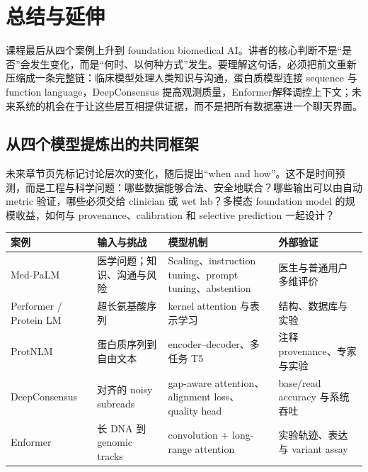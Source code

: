 \section{总结与延伸}

课程最后从四个案例上升到 foundation biomedical AI。讲者的核心判断不是“是否”会发生变化，而是“何时、以何种方式”发生。要理解这句话，必须把前文重新压缩成一条完整链：临床模型处理人类知识与沟通，蛋白质模型连接 sequence 与 function language，DeepConsensus 提高观测质量，Enformer解释调控上下文；未来系统的机会在于让这些层互相提供证据，而不是把所有数据塞进一个聊天界面。

\subsection{从四个模型提炼出的共同框架}

未来章节页先标记讨论层次的变化，随后提出“when and how”。这不是时间预测，而是工程与科学问题：哪些数据能够合法、安全地联合？哪些输出可以由自动 metric 验证，哪些必须交给 clinician 或 wet lab？多模态 foundation model 的规模收益，如何与 provenance、calibration 和 selective prediction 一起设计？



\begin{longtable}{@{}L{0.19\textwidth}L{0.25\textwidth}L{0.25\textwidth}L{0.19\textwidth}@{}}
\toprule
案例 & 输入与挑战 & 模型机制 & 外部验证 \\
\midrule
Med-PaLM & 医学问题；知识、沟通与风险 & Scaling、instruction tuning、prompt tuning、abstention & 医生与普通用户多维评价 \\
Performer / Protein LM & 超长氨基酸序列 & kernel attention 与表示学习 & 结构、数据库与实验 \\
ProtNLM & 蛋白质序列到自由文本 & encoder--decoder、多任务 T5 & 注释 provenance、专家与实验 \\
DeepConsensus & 对齐的 noisy subreads & gap-aware attention、alignment loss、quality head & base/read accuracy 与系统吞吐 \\
Enformer & 长 DNA 到 genomic tracks & convolution + long-range attention & 实验轨迹、表达与 variant assay \\
\bottomrule
\end{longtable}


